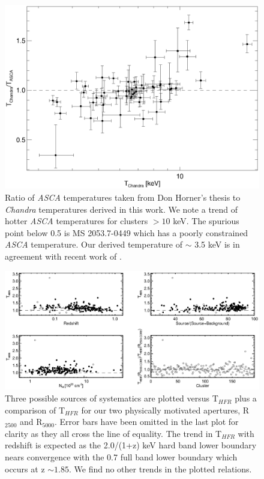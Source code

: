 \documentclass{emulateapj}
\newcommand{\tf}{T$_{HFR}$ }
\begin{document}
\clearpage
\begin{figure}[htp]
\begin{center}
\includegraphics[scale=1.0]{asch}
\caption{\small Ratio of {\textit{ASCA}} temperatures taken from Don
Horner's thesis to {\textit{Chandra}} temperatures derived in this
work. We note a trend of hotter {\textit{ASCA}} temperatures for
clusters $> 10$ keV. The spurious point below 0.5 is MS
2053.7-0449 which has a poorly constrained {\textit{ASCA}}
temperature. Our derived temperature of $\sim$ 3.5 keV is in agreement
with recent work of \cite{2007astro.ph..3156M}.}
\label{fig:asch}
\end{center}
\end{figure}

\clearpage
\begin{figure}[htp]
\begin{center}
\includegraphics[scale=1.0]{sys}
\caption{\small Three possible sources of systematics are
plotted versus \tf plus a comparison of \tf for our two
physically motivated apertures, R$_{2500}$ and R$_{5000}$. Error bars
have been omitted in the last plot for clarity as they all cross the
line of equality. The trend in \tf with redshift is expected as the
2.0/(1+z) keV hard band lower boundary nears convergence with the 0.7
full band lower boundary which occurs at z $\sim 1.85$. We find no
other trends in the plotted relations.}
\label{fig:sys}
\end{center}
\end{figure}
\end{document}
